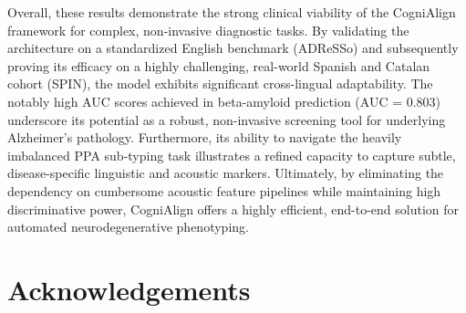 \documentclass{Odyssey2026}
\begin{document}
Overall, these results demonstrate the strong clinical viability of the CogniAlign framework for complex, non-invasive diagnostic tasks. By validating the architecture on a standardized English benchmark (ADReSSo) and subsequently proving its efficacy on a highly challenging, real-world Spanish and Catalan cohort (SPIN), the model exhibits significant cross-lingual adaptability. The notably high AUC scores achieved in beta-amyloid prediction (AUC = 0.803) underscore its potential as a robust, non-invasive screening tool for underlying Alzheimer's pathology. Furthermore, its ability to navigate the heavily imbalanced PPA sub-typing task illustrates a refined capacity to capture subtle, disease-specific linguistic and acoustic markers. Ultimately, by eliminating the dependency on cumbersome acoustic feature pipelines while maintaining high discriminative power, CogniAlign offers a highly efficient, end-to-end solution for automated neurodegenerative phenotyping.

\section{Acknowledgements}



\newpage
\clearpage


\end{document}
